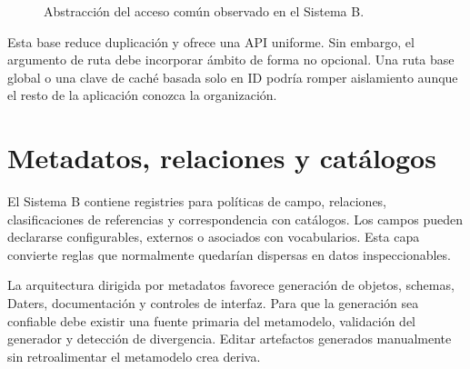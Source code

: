 \begin{figure}[H]
\centering
{}
\caption{Abstracción del acceso común observado en el Sistema B.}
\label{fig:flujo-sistema-b}
\end{figure}

Esta base reduce duplicación y ofrece una API uniforme. Sin embargo, el argumento de
ruta debe incorporar ámbito de forma no opcional. Una ruta base global o una clave de
caché basada solo en ID podría romper aislamiento aunque el resto de la aplicación
conozca la organización.

\section{Metadatos, relaciones y catálogos}

El Sistema B contiene registries para políticas de campo, relaciones, clasificaciones de
referencias y correspondencia con catálogos. Los campos pueden declararse configurables,
externos o asociados con vocabularios. Esta capa convierte reglas que normalmente
quedarían dispersas en datos inspeccionables.

La arquitectura dirigida por metadatos favorece generación de objetos, schemas, Daters,
documentación y controles de interfaz. Para que la generación sea confiable debe existir
una fuente primaria del metamodelo, validación del generador y detección de divergencia.
Editar artefactos generados manualmente sin retroalimentar el metamodelo crea deriva.

